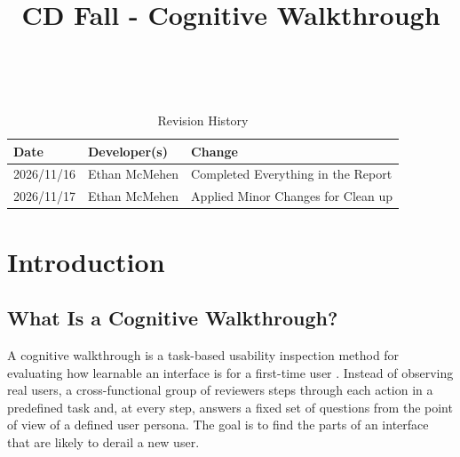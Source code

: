 \documentclass{article}
\title{CD Fall - Cognitive Walkthrough\\\progname}
\author{\authname}
\date{}
\begin{document}
\maketitle

~\newpage


\begin{table}[!htbp]
\caption{Revision History} \label{TblRevisionHistory}
\begin{tabularx}{\textwidth}{llX}
\toprule
\textbf{Date} & \textbf{Developer(s)} & \textbf{Change}\\
\midrule
2026/11/16 & Ethan McMehen & Completed Everything in the Report \\
2026/11/17 & Ethan McMehen & Applied Minor Changes for Clean up \\
\bottomrule
\end{tabularx}
\end{table}

\newpage

\tableofcontents

\newpage


\section{Introduction}\label{sec:intro}

\subsection{What Is a Cognitive Walkthrough?}\label{sec:whatIs}

A cognitive walkthrough is a task-based usability inspection method for evaluating how 
learnable an interface is for a first-time user \cite{nng-overview}. Instead of observing 
real users, a cross-functional group of reviewers steps through each action in a predefined 
task and, at every step, answers a fixed set of questions from the point of view of a 
defined user persona. The goal is to find the parts of an interface that are likely 
to derail a new user.
\end{document}
